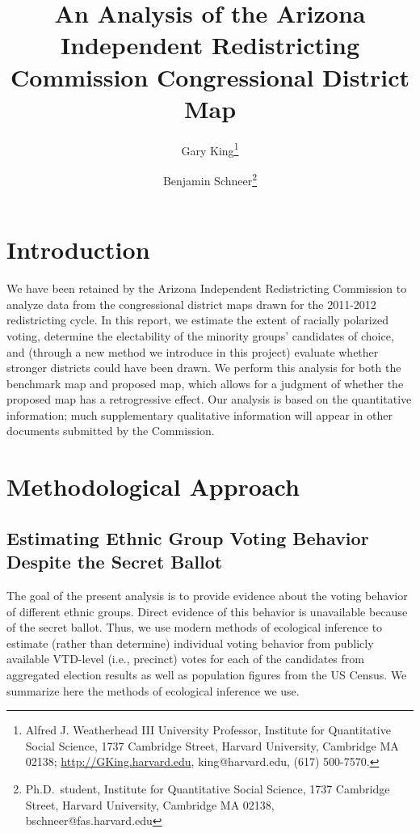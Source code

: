 \documentclass[12pt]{scrartcl}
\title{An Analysis of the Arizona Independent Redistricting Commission
  Congressional District Map}
\author{Gary King\thanks{Alfred J.
    Weatherhead III University Professor, Institute for Quantitative
    Social Science, 1737 Cambridge Street, Harvard University,
    Cambridge MA 02138; \url{http://GKing.harvard.edu},
    king@harvard.edu, (617) 500-7570.}  \and Benjamin
  Schneer\thanks{Ph.D.\ student, Institute for Quantitative Social
    Science, 1737 Cambridge Street, Harvard University, Cambridge MA
    02138, bschneer@fas.harvard.edu} }
\begin{document}
\maketitle

\doublespacing

\section{Introduction}

We have been retained by the Arizona Independent Redistricting
Commission to analyze data from the congressional district maps drawn
for the 2011-2012 redistricting cycle. In this report, we estimate the
extent of racially polarized voting, determine the electability of the
minority groups' candidates of choice, and (through a new method we
introduce in this project) evaluate whether stronger districts could
have been drawn.  We perform this analysis for both the benchmark map
and proposed map, which allows for a judgment of whether the proposed
map has a retrogressive effect.  Our analysis is based on the
quantitative information; much supplementary qualitative information
will appear in other documents submitted by the Commission.



\section{Methodological Approach}

\subsection{Estimating Ethnic Group Voting Behavior Despite the Secret Ballot}

The goal of the present analysis is to provide evidence about the
voting behavior of different ethnic groups. Direct evidence of this
behavior is unavailable because of the secret ballot. Thus, we use
modern methods of ecological inference to estimate (rather than
determine) individual voting behavior from publicly available
VTD-level (i.e., precinct) votes for each of the candidates from
aggregated election results as well as population figures from the US
Census.  We summarize here the methods of ecological inference we use.
\end{document}
